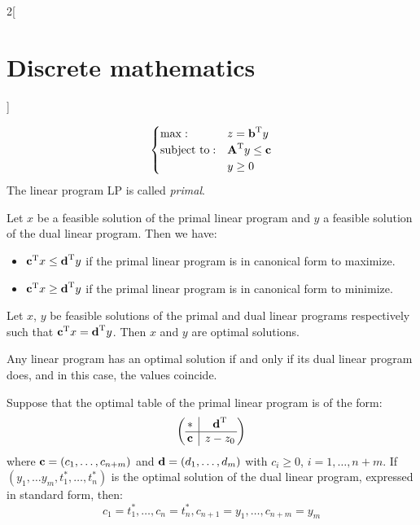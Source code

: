 \documentclass[../../../main.tex]{subfiles}
\begin{document}
\begin{multicols}{2}[\section{Discrete mathematics}]
\begin{definition}
$$      \begin{cases}
        \max:              & z=\vb{\boldsymbol{\mathrm{b}}}^{\mathrm{T}}y          \\
        \text{subject to}: & \vb{\boldsymbol{\mathrm{A}}}^{\mathrm{T}}y\leq \boldsymbol{\mathrm{c}} \\
                           & y\geq 0
      \end{cases}$$ The linear program LP is called \emph{primal}.
  \end{definition}
  \begin{theorem}
    Let $x$ be a feasible solution of the primal linear program and $y$ a feasible solution of the dual linear program. Then we have:
    \begin{itemize}
      \item $\vb{\boldsymbol{\mathrm{c}}}^{\mathrm{T}}x\leq \vb{\boldsymbol{\mathrm{d}}}^{\mathrm{T}}y$ if the primal linear program is in canonical form to maximize.
      \item $\vb{\boldsymbol{\mathrm{c}}}^{\mathrm{T}}x\geq \vb{\boldsymbol{\mathrm{d}}}^{\mathrm{T}}y$ if the primal linear program is in canonical form to minimize.
    \end{itemize}
  \end{theorem}
  \begin{corollary}
    Let $x$, $y$ be feasible solutions of the primal and dual linear programs respectively such that $\vb{\boldsymbol{\mathrm{c}}}^{\mathrm{T}}x=\vb{\boldsymbol{\mathrm{d}}}^{\mathrm{T}}y$. Then $x$ and $y$ are optimal solutions.
  \end{corollary}
  \begin{theorem}
    Any linear program has an optimal solution if and only if its dual linear program does, and in this case, the values coincide.
  \end{theorem}
  \begin{theorem}
    Suppose that the optimal table of the primal linear program is of the form:
    $$\left(
      \begin{array}{@{\,} c|c @{\,}}
          *      & \transpose{\vf{d}} \\
          \hline
          \vf{c} & z-z_0              \\
        \end{array}\right)$$ where $\boldsymbol{\mathrm{c}}=(c_1,\ldots,c_{n+m})$ and $\boldsymbol{\mathrm{d}}=(d_1,\ldots,d_m)$ with $c_i\geq0$, $i=1,\ldots,n+m$. If $(y_1,\ldots y_m,t_1^*,\ldots,t_n^*)$ is the optimal solution of the dual linear program, expressed in standard form, then: $$c_1=t_1^*,\ldots,c_n=t_n^*, c_{n+1}=y_1,\ldots,c_{n+m}=y_m$$
  \end{theorem}
\end{multicols}
\end{document}
